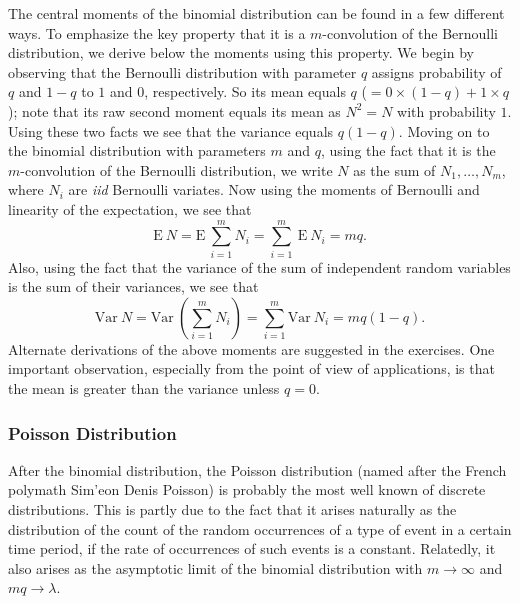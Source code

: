 \documentclass[]{book}
\theoremstyle{definition}
\theoremstyle{definition}
\theoremstyle{definition}
\theoremstyle{remark}
\begin{document}
The central moments of the binomial distribution can be found in a few
different ways. To emphasize the key property that it is a
\(m\)-convolution of the Bernoulli distribution, we derive below the
moments using this property. We begin by observing that the Bernoulli
distribution with parameter \(q\) assigns probability of \(q\) and
\(1-q\) to \(1\) and \(0\), respectively. So its mean equals \(q\)
(\(=0\times (1-q) + 1\times q\)); note that its raw second moment equals
its mean as \(N^2=N\) with probability \(1\). Using these two facts we
see that the variance equals \(q(1-q)\). Moving on to the binomial
distribution with parameters \(m\) and \(q\), using the fact that it is
the \(m\)-convolution of the Bernoulli distribution, we write \(N\) as
the sum of \(N_1,\ldots,N_m\), where \(N_i\) are \emph{iid} Bernoulli
variates. Now using the moments of Bernoulli and linearity of the
expectation, we see that \[
\mathrm{E}~{N}=\mathrm{E}~{\sum_{i=1}^m N_i} = \sum_{i=1}^m ~\mathrm{E}~{N_i} = mq.
\] Also, using the fact that the variance of the sum of independent
random variables is the sum of their variances, we see that\\
\[
\mathrm{Var}~{N}=\mathrm{Var}~\left({\sum_{i=1}^m N_i}\right)=\sum_{i=1}^m \mathrm{Var}~{N_i} = mq(1-q).
\] Alternate derivations of the above moments are suggested in the
exercises. One important observation, especially from the point of view
of applications, is that the mean is greater than the variance unless
\(q=0\).

\subsubsection{Poisson Distribution}\label{S:poisson-distribution}

After the binomial distribution, the Poisson distribution (named after
the French polymath Sim'eon Denis Poisson) is probably the most well
known of discrete distributions. This is partly due to the fact that it
arises naturally as the distribution of the count of the random
occurrences of a type of event in a certain time period, if the rate of
occurrences of such events is a constant. Relatedly, it also arises as
the asymptotic limit of the binomial distribution with
\(m\rightarrow \infty\) and \(mq\rightarrow \lambda\).
\end{document}

